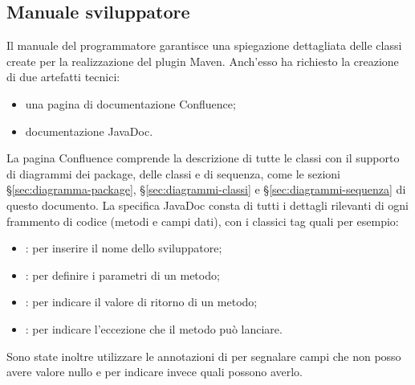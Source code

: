    \subsection{Manuale sviluppatore}
    Il manuale del programmatore garantisce una spiegazione dettagliata delle classi create per la realizzazione del plugin Maven.
    Anch'esso ha richiesto la creazione di due artefatti tecnici:
    \begin{itemize}
        \item una pagina di documentazione Confluence;
        \item documentazione JavaDoc.
    \end{itemize}
    La pagina Confluence comprende la descrizione di tutte le classi con il supporto di diagrammi dei package, delle classi e di sequenza, come le sezioni \S\ref{sec:diagramma-package}, \S\ref{sec:diagrammi-classi} e \S\ref{sec:diagrammi-sequenza} di questo documento.
    La specifica JavaDoc consta di tutti i dettagli rilevanti di ogni frammento di codice (metodi e campi dati), con i classici tag \cite{site:javadoc} quali per esempio:
    \begin{itemize}
        \item {}: per inserire il nome dello sviluppatore;
        \item {}: per definire i parametri di un metodo;
        \item {}: per indicare il valore di ritorno di un metodo;
        \item {}: per indicare l'eccezione che il metodo può lanciare.
    \end{itemize}
    Sono state inoltre utilizzare le annotazioni di  per segnalare campi che non posso avere valore nullo e  per indicare invece quali possono averlo.






